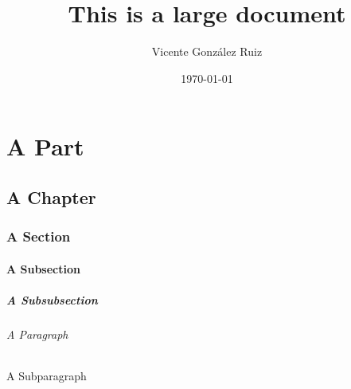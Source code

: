 \documentclass{report}
\begin{document}
\title{This is a large document}
\author{Vicente Gonz\'alez Ruiz}
\date{\today}

\maketitle

\part{A Part}
\chapter{A Chapter}
\section{A Section}
\subsection{A Subsection}
\subsubsection{A Subsubsection}
\paragraph{A Paragraph}
\subparagraph{A Subparagraph}
\end{document}
